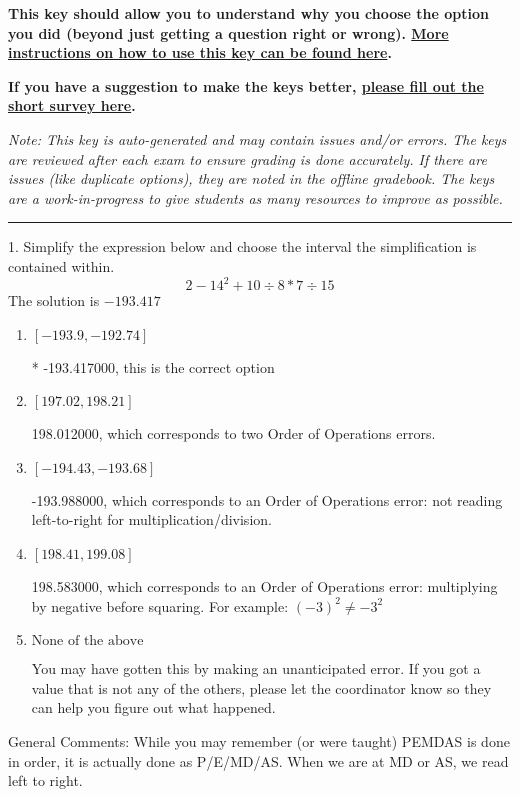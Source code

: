 \documentclass{extbook}[14pt]
\begin{document}
\textbf{This key should allow you to understand why you choose the option you did (beyond just getting a question right or wrong). \href{https://xronos.clas.ufl.edu/mac1105spring2020/courseDescriptionAndMisc/Exams/LearningFromResults}{More instructions on how to use this key can be found here}.}

\textbf{If you have a suggestion to make the keys better, \href{https://forms.gle/CZkbZmPbC9XALEE88}{please fill out the short survey here}.}

\textit{Note: This key is auto-generated and may contain issues and/or errors. The keys are reviewed after each exam to ensure grading is done accurately. If there are issues (like duplicate options), they are noted in the offline gradebook. The keys are a work-in-progress to give students as many resources to improve as possible.}

\rule{\textwidth}{0.4pt}

1. Simplify the expression below and choose the interval the simplification is contained within.
\[ 2 - 14^2 + 10 \div 8 * 7 \div 15 \] 
The solution is $ -193.417 $ 

\begin{enumerate}[label=\Alph*.] 
\item $ [-193.9, -192.74] $ 

 * -193.417000, this is the correct option 
\item $ [197.02, 198.21] $ 

  198.012000, which corresponds to two Order of Operations errors. 
\item $ [-194.43, -193.68] $ 

  -193.988000, which corresponds to an Order of Operations error: not reading left-to-right for multiplication/division. 
\item $ [198.41, 199.08] $ 

  198.583000, which corresponds to an Order of Operations error: multiplying by negative before squaring. For example: $(-3)^2 \neq -3^2$ 
\item $ \text{None of the above} $ 

  You may have gotten this by making an unanticipated error. If you got a value that is not any of the others, please let the coordinator know so they can help you figure out what happened. 
\end{enumerate} 
 
General Comments: While you may remember (or were taught) PEMDAS is done in order, it is actually done as P/E/MD/AS. When we are at MD or AS, we read left to right.
\end{document}
